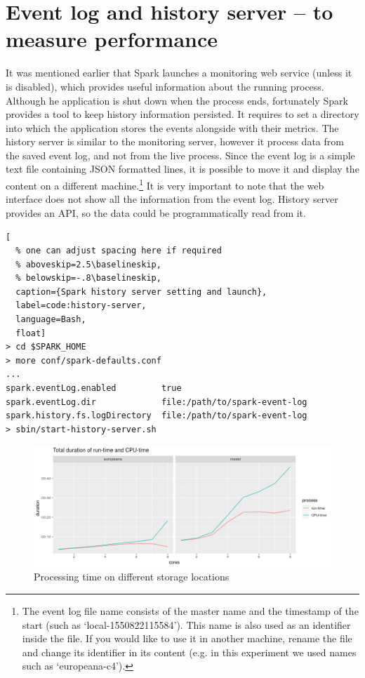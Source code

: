 \section{Event log and history server -- to measure performance}

It was mentioned earlier that Spark launches a monitoring web service (unless it is disabled), which provides useful information about the running process. Although he application is shut down when the process ends, fortunately Spark provides a tool to keep history information persisted. It requires to set a directory into which the application stores the events alongside with their metrics. The history server is similar to the monitoring server, however it process data from the saved event log, and not from the live process. Since the event log is a simple text file containing JSON formatted lines, it is possible to move it and display the content on a different machine.\footnote{The event log file name consists of the master name and the timestamp of the start (such as `local-1550822115584'). This name is also used as an identifier inside the file. If you would like to use it in another machine, rename the file and change its identifier in its content (e.g. in this experiment we used names such as `europeana-c4').} It is very important to note that the web interface does not show all the information from the event log. History server provides an API, so the data could be programmatically read from it.

\begin{lstlisting}[
  % one can adjust spacing here if required
  % aboveskip=2.5\baselineskip,
  % belowskip=-.8\baselineskip,
  caption={Spark history server setting and launch},
  label=code:history-server,
  language=Bash,
  float]
> cd $SPARK_HOME
> more conf/spark-defaults.conf
...
spark.eventLog.enabled         true
spark.eventLog.dir             file:/path/to/spark-event-log
spark.history.fs.logDirectory  file:/path/to/spark-event-log
> sbin/start-history-server.sh
\end{lstlisting}

\begin{figure}
\includegraphics[width=\textwidth]{images/chapter06/runtime-vs-cputime-absolute.png}
\caption{Processing time on different storage locations}
\label{runtime-vs-cputime-absolute}
\end{figure}

